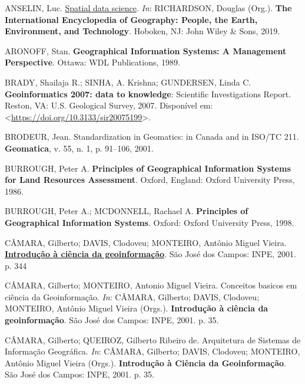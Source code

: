 \documentclass[
  letterpaper,
  DIV=11,
  numbers=noendperiod]{scrreprt}
\newlength{\cslhangindent}
\newenvironment{CSLReferences}[2] %
 {\begin{list}{}{%
  \setlength{\itemindent}{0pt}
  \setlength{\leftmargin}{0pt}
  \setlength{\parsep}{0pt}
  \ifodd #1
   \setlength{\leftmargin}{\cslhangindent}
   \setlength{\itemindent}{-1\cslhangindent}
  \fi
  \setlength{\itemsep}{#2\baselineskip}}}
 {\end{list}}
\begin{document}
\label{refs}
\begin{CSLReferences}{0}{1}
ANSELIN, Luc. \href{https://doi.org/10.1002/9781118786352.wbieg}{Spatial
data science}. \emph{In}: RICHARDSON, Douglas (Org.). \textbf{The
International Encyclopedia of Geography: People, the Earth, Environment,
and Technology}. Hoboken, NJ: John Wiley \& Sons, 2019.

ARONOFF, Stan. \textbf{Geographical Information Systems: A Management
Perspective}. Ottawa: WDL Publications, 1989.

BRADY, Shailaja R.; SINHA, A. Krishna; GUNDERSEN, Linda C.
\textbf{Geoinformatics 2007: data to knowledge}: Scientific
Investigations Report. Reston, VA: U.S. Geological Survey, 2007.
Disponível em:
\textless{}\url{https://doi.org/10.3133/sir20075199}\textgreater.

BRODEUR, Jean. Standardization in Geomatics: in Canada and in ISO/TC
211. \textbf{Geomatica}, v. 55, n. 1, p. 91--106, 2001.

BURROUGH, Peter A. \textbf{Principles of Geographical Information
Systems for Land Resources Assessment}. Oxford, England: Oxford
University Press, 1986.

BURROUGH, Peter A.; MCDONNELL, Rachael A. \textbf{Principles of
Geographical Information Systems}. Oxford: Oxford University Press,
1998.

CÂMARA, Gilberto; DAVIS, Clodoveu; MONTEIRO, Antônio Miguel Vieira.
\textbf{\href{http://urlib.net/ibi/6qtX3pFwXQZ3ukuKE/BQGus}{Introdu{ç}{ã}o
{à} ci{ê}ncia da geoinforma{ç}{ã}o}}. São José dos Campos: INPE, 2001.
p. 344

CÂMARA, Gilberto; MONTEIRO, Antonio Miguel Vieira. Conceitos basicos em
ci{ê}ncia da Geoinforma{ç}{ã}o. \emph{In}: CÂMARA, Gilberto; DAVIS,
Clodoveu; MONTEIRO, Antônio Miguel Vieira (Orgs.).
\textbf{Introdu{ç}{ã}o {à} ci{ê}ncia da geoinforma{ç}{ã}o}. S{ã}o Jos{é}
dos Campos: INPE, 2001. p. 35.

CÂMARA, Gilberto; QUEIROZ, Gilberto Ribeiro de. Arquitetura de Sistemas
de Informação Geográfica. \emph{In}: CÂMARA, Gilberto; DAVIS, Clodoveu;
MONTEIRO, Antônio Miguel Vieira (Orgs.). \textbf{Introdução à Ciência da
Geoinformação}. São José dos Campos: INPE, 2001. p. 35.


\end{CSLReferences}
\end{document}
